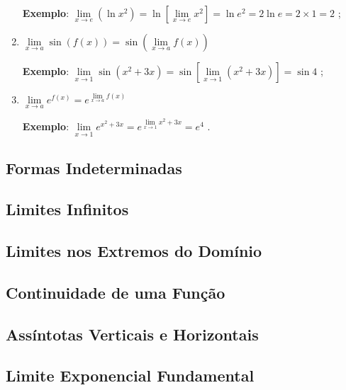\begin{enumerate}[label=(P\arabic*)]
			\medskip

			\textbf{Exemplo}: $\lim \limits_{x \to e} (\ln x^{2}) = \ln \left[ \lim \limits_{x \to e} x^{2} \right] = \ln e^{2} = 2 \ln e = 2 \times 1 = 2$ ;

			\item {\LARGE $\lim \limits_{x \to a} \sin (f(x)) = \sin \left( \lim \limits_{x \to a} f(x) \right)$}

			\medskip

			\textbf{Exemplo}: $\lim \limits_{x \to 1} \sin (x^{2} + 3x) = \sin \left[ \lim \limits_{x \to 1} (x^{2} +3x) \right] = \sin 4$ ;

			\item {\LARGE $\lim \limits_{x \to a} e^{f(x)} = e^{\lim \limits_{x \to a} f(x)}$}

			\medskip

			\textbf{Exemplo}: $\lim \limits_{x \to 1} e^{x^{2} + 3x} = e^{\lim \limits_{x \to 1} x^{2} +3x} = e^{4}$ .

		\end{enumerate}

	\subsection{Formas Indeterminadas \cite{morettin}}

	\subsection{Limites Infinitos \cite{morettin}}

	\subsection{Limites nos Extremos do Domínio \cite{morettin}}

	\subsection{Continuidade de uma Função \cite{morettin}}

	\subsection{Assíntotas Verticais e Horizontais \cite{morettin}}

	\subsection{Limite Exponencial Fundamental \cite{morettin}}